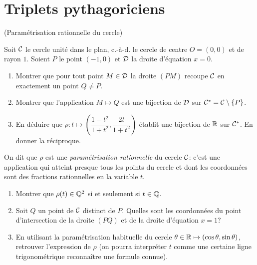 \documentclass[a4paper,11pt,reqno]{amsart}
\begin{document}
\newpage
\section{Triplets pythagoriciens}

\begin{exo}\label{cerclerat} (Paramétrisation rationnelle du cercle)

  Soit $\mathcal{C}$ le cercle unité dans le plan, c.-à-d. le cercle de centre $O=(0,0)$ et de rayon $1$. Soient $P$ le point $(-1,0)$ et $\mathcal{D}$ la droite d'équation $x=0$.
  \begin{enumerate}
    \item Montrer que pour tout point $M \in \mathcal{D}$ la droite $(PM)$ recoupe $\mathcal{C}$ en exactement un point $Q \neq P$.
    \item Montrer que l'application $M \mapsto Q$ est une bijection de $\mathcal{D}$ sur $\mathcal{C}^\ast=\mathcal{C} \setminus \{P\}$.
    \item En déduire que $\rho \colon t \longmapsto \left( \dfrac{1-t^2}{1+t^2}, \dfrac{2t}{1+t^2}\right)$ établit une bijection de $\mathbb{R}$ sur $\mathcal{C}^\ast$. En donner la réciproque.
  \end{enumerate}
  \begin{convention}
      On dit que $\rho$ est une \emph{paramétrisation rationnelle} du cercle $\mathcal{C}$: c'est une application qui atteint presque tous les points du cercle et dont les coordonnées sont des fractions rationnelles en la variable $t$.
  \end{convention}
  \begin{enumerate}[resume]
    \item Montrer que $\rho(t) \in \mathbb{Q}^2$ si et seulement si $t \in \mathbb{Q}$.
    \item Soit $Q$ un point de $\mathcal{C}$ distinct de $P$. Quelles sont les coordonnées du point d'intersection de la droite $(PQ)$ et de la droite d'équation $x=1$?
    \item En utilisant la paramétrisation habituelle du cercle $\theta \in \mathbb{R} \mapsto (\cos \theta,\sin \theta)$, retrouver l'expression de $\rho$ (on pourra interpréter $t$ comme une certaine ligne trigonométrique reconnaître une formule connue).
  \end{enumerate}
\end{exo}
\end{document}
